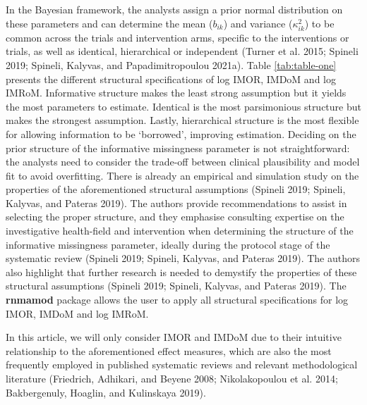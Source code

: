 In the Bayesian framework, the analysts assign a prior normal distribution on these parameters and can determine the mean (\(b_{ik}\)) and variance (\(\kappa^{2}_{ik}\)) to be common across the trials and intervention arms, specific to the interventions or trials, as well as identical, hierarchical or independent (Turner et al. 2015; Spineli 2019; Spineli, Kalyvas, and Papadimitropoulou 2021a). Table
\ref{tab:table-one} presents the different structural specifications of log IMOR, IMDoM and log IMRoM. Informative structure makes the least strong assumption but it yields the most parameters to estimate. Identical is the most parsimonious structure but makes the strongest assumption. Lastly, hierarchical structure is the most flexible for allowing information to be `borrowed', improving estimation. Deciding on the prior structure of the informative missingness parameter is not
straightforward: the analysts need to consider the trade-off between clinical plausibility and model fit to avoid overfitting. There is already an empirical and simulation study on the properties of the aforementioned structural assumptions (Spineli 2019; Spineli, Kalyvas, and Pateras 2019). The authors provide recommendations to assist in selecting the proper structure, and they emphasise consulting expertise on the investigative health-field and intervention when determining the structure of the informative missingness parameter, ideally during the protocol stage of the systematic review (Spineli 2019; Spineli, Kalyvas, and Pateras 2019). The authors also highlight that further research is needed to demystify the properties of these structural assumptions (Spineli 2019; Spineli, Kalyvas, and Pateras 2019). The \textbf{rnmamod} package allows the user to apply all structural specifications for log IMOR, IMDoM and log IMRoM.

In this article, we will only consider IMOR and IMDoM due to their intuitive relationship to the aforementioned effect measures, which are also the most frequently employed in published systematic reviews and relevant methodological literature (Friedrich, Adhikari, and Beyene 2008; Nikolakopoulou et al. 2014; Bakbergenuly, Hoaglin, and Kulinskaya 2019).

